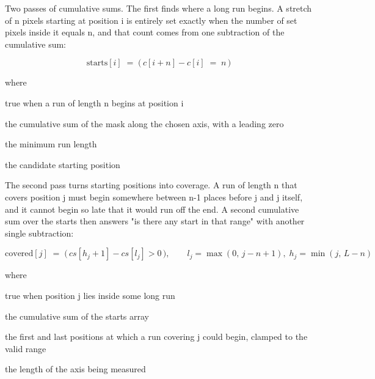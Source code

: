 Two passes of cumulative sums. The first finds where a long run begins. A stretch of n pixels starting at position i is entirely set exactly when the number of set pixels inside it equals n, and that count comes from one subtraction of the cumulative sum:


\begin{equation}
\mathrm{starts}[i] \;=\; \big(\, c[i+n] - c[i] \;=\; n \,\big)
\end{equation}

\noindent where
\begin{description}[leftmargin=2.4em,style=nextline,font=\normalfont\ttfamily]\setlength\itemsep{1pt}
  \item[{$\mathrm{starts}[i]$}] \normalfont true when a run of length n begins at position i
  \item[{$c$}] \normalfont the cumulative sum of the mask along the chosen axis, with a leading zero
  \item[{$n$}] \normalfont the minimum run length
  \item[{$i$}] \normalfont the candidate starting position
\end{description}
The second pass turns starting positions into coverage. A run of length n that covers position j must begin somewhere between n-1 places before j and j itself, and it cannot begin so late that it would run off the end. A second cumulative sum over the starts then answers "is there any start in that range" with another single subtraction:


\begin{equation}
\mathrm{covered}[j] \;=\; \big(\, cs[h_j+1] - cs[l_j] > 0 \,\big), \qquad l_j = \max(0,\,j-n+1),\; h_j = \min(j,\,L-n)
\end{equation}

\noindent where
\begin{description}[leftmargin=2.4em,style=nextline,font=\normalfont\ttfamily]\setlength\itemsep{1pt}
  \item[{$\mathrm{covered}[j]$}] \normalfont true when position j lies inside some long run
  \item[{$cs$}] \normalfont the cumulative sum of the starts array
  \item[{$l_j, h_j$}] \normalfont the first and last positions at which a run covering j could begin, clamped to the valid range
  \item[{$L$}] \normalfont the length of the axis being measured
\end{description}

